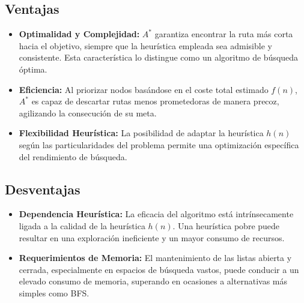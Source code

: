 \subsection*{Ventajas}
\begin{itemize}
    \item \textbf{Optimalidad y Complejidad:} $A^{*}$ garantiza encontrar la ruta más corta hacia el 
                objetivo, siempre que la heurística empleada sea admisible y consistente. Esta 
                característica lo distingue como un algoritmo de búsqueda óptima.
    \item \textbf{Eficiencia:} Al priorizar nodos basándose en el coste total estimado \(f(n)\), $A^{*}$ 
                es capaz de descartar rutas menos prometedoras de manera precoz, agilizando la 
                consecución de su meta.
    \item \textbf{Flexibilidad Heurística:} La posibilidad de adaptar la heurística \(h(n)\) según 
                las particularidades del problema permite una optimización específica del 
                rendimiento de búsqueda.
\end{itemize}
\subsection*{Desventajas}
\begin{itemize}
    \item \textbf{Dependencia Heurística:} La eficacia del algoritmo está intrínsecamente ligada 
                a la calidad de la heurística \(h(n)\). Una heurística pobre puede resultar en 
                una exploración ineficiente y un mayor consumo de recursos.
    \item \textbf{Requerimientos de Memoria:} El mantenimiento de las listas abierta y cerrada,
                especialmente en espacios de búsqueda vastos, puede conducir a un elevado 
                consumo de memoria, superando en ocasiones a alternativas más simples como BFS.
\end{itemize}

